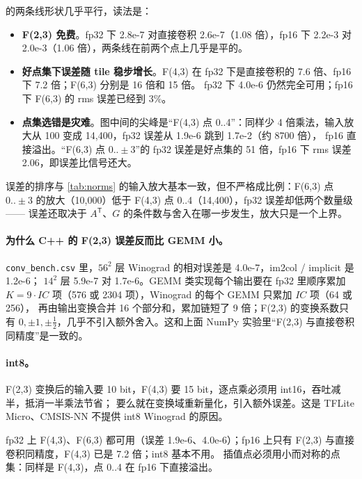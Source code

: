 \documentclass[11pt,a4paper]{ctexart}
\begin{document}
 的两条线形状几乎平行，读法是：
\begin{itemize}
  \item \textbf{F(2,3) 免费}。fp32 下 2.8e-7 对直接卷积 2.6e-7（1.08 倍），fp16 下 2.2e-3 对 2.0e-3（1.06 倍），两条线在前两个点上几乎是平的。
  \item \textbf{好点集下误差随 tile 稳步增长}。F(4,3) 在 fp32 下是直接卷积的 7.6 倍、fp16 下 7.2 倍；F(6,3) 分别是 16 倍和 15 倍。
  fp32 下 4.0e-6 仍然完全可用；fp16 下 F(6,3) 的 rms 误差已经到 3\%。
  \item \textbf{点集选错是灾难}。图中间的尖峰是“F(4,3) 点 0..4”：同样少 4 倍乘法，输入放大从 100 变成 14,400，fp32 误差从 1.9e-6 跳到 1.7e-2（约 8700 倍），
  fp16 直接溢出。“F(6,3) 点 $0..\pm3$”的 fp32 误差是好点集的 51 倍，fp16 下 rms 误差 2.06，即误差比信号还大。
\end{itemize}
误差的排序与 \cref{tab:norms} 的输入放大基本一致，但不严格成比例：F(6,3) 点 $0..\pm3$ 的放大（10,000）低于 F(4,3) 点 0..4（14,400），fp32 误差却低两个数量级——
误差还取决于 $A^{\mathsf T}$、$G$ 的条件数与舍入在哪一步发生，放大只是一个上界。

\paragraph{为什么 C++ 的 F(2,3) 误差反而比 GEMM 小。} \texttt{conv\_bench.csv} 里，$56^2$ 层 Winograd 的相对误差是 4.0e-7，im2col / implicit 是 1.2e-6；
$14^2$ 层 5.9e-7 对 1.7e-6。GEMM 类实现每个输出要在 fp32 里顺序累加 $K = 9\cdot IC$ 项（576 或 2304 项），Winograd 的每个 GEMM 只累加 $IC$ 项（64 或 256），
再由输出变换合并 16 个部分和，累加链短了 9 倍；F(2,3) 的变换系数只有 $0,\pm1,\pm\tfrac12$，几乎不引入额外舍入。这和上面 NumPy 实验里“F(2,3) 与直接卷积同精度”是一致的。

\paragraph{int8。} F(2,3) 变换后的输入要 10 bit，F(4,3) 要 15 bit，逐点乘必须用 int16，吞吐减半，抵消一半乘法节省；
要么就在变换域重新量化，引入额外误差。这是 TFLite Micro、CMSIS-NN 不提供 int8 Winograd 的原因。

\begin{findingbox}
fp32 上 F(4,3)、F(6,3) 都可用（误差 1.9e-6、4.0e-6）；fp16 上只有 F(2,3) 与直接卷积同精度，F(4,3) 已是 7.2 倍；int8 基本不用。
插值点必须用小而对称的点集：同样是 F(4,3)，点 0..4 在 fp16 下直接溢出。
\end{findingbox}
\end{document}
